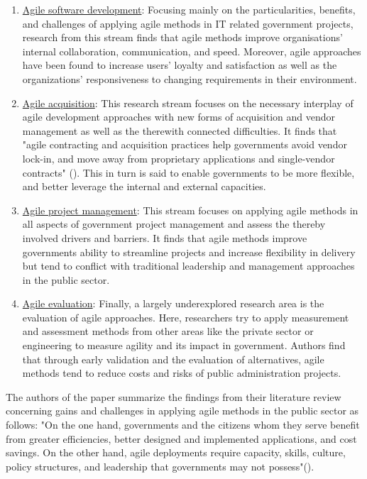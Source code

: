 \documentclass[a4paper]{article}
\begin{document}
\begin{spacing}{1.5}
\begin{enumerate}
    \item \underline{Agile software development}: Focusing mainly on the particularities, benefits, and challenges of applying agile methods in IT related government projects, research from this stream finds that agile methods improve organisations' internal collaboration, communication, and speed. Moreover, agile approaches have been found to increase users' loyalty and satisfaction as well as the organizations' responsiveness to changing requirements in their environment. 
    \item \underline{Agile acquisition}: This research stream focuses on the necessary interplay of agile development approaches with new forms of acquisition and vendor management as well as the therewith connected difficulties. It finds that "agile contracting and acquisition practices help governments avoid vendor lock-in, and move away from proprietary applications and single-vendor contracts" (\cite[p. 296]{Mergel2018}). This in turn is said to enable governments to be more flexible, and better leverage the internal and external capacities. 
    \item \underline{Agile project management}: This stream focuses on applying agile methods in all aspects of government project management and assess the thereby involved drivers and barriers. It finds that agile methods improve governments ability to streamline projects and increase flexibility in delivery but tend to conflict with traditional leadership and management approaches in the public sector.
    \item \underline{Agile evaluation}: Finally, a largely underexplored research area is the evaluation of agile approaches. Here, researchers try to apply measurement and assessment methods from other areas like the private sector or engineering to measure agility and its impact in government. Authors find that through early validation and the evaluation of alternatives, agile methods tend to reduce costs and risks of public administration projects.
\end{enumerate}\par 
%
The authors of the paper summarize the findings from their literature review concerning gains and challenges in applying agile methods in the public sector as follows: "On the one hand, governments and the citizens whom they serve benefit from greater efficiencies, better designed and implemented applications, and cost savings. On the other hand, agile deployments require capacity, skills, culture, policy structures, and leadership that governments may not possess"(\cite[p. 298]{Mergel2018}).\par 

\end{spacing}
\end{document}
